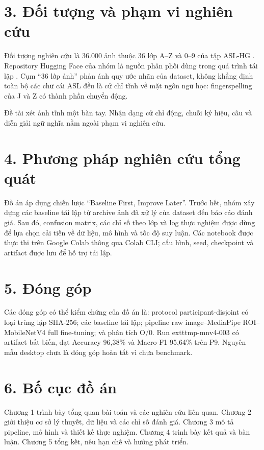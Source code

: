 \section*{3. Đối tượng và phạm vi nghiên cứu}
Đối tượng nghiên cứu là 36.000 ảnh thuộc 36 lớp A--Z và 0--9 của tập ASL-HG \cite{asl-hg-original}. Repository Hugging Face của nhóm là nguồn phân phối dùng trong quá trình tái lập \cite{asl-hg-repo}. Cụm ``36 lớp ảnh'' phản ánh quy ước nhãn của dataset, không khẳng định toàn bộ các chữ cái ASL đều là cử chỉ tĩnh về mặt ngôn ngữ học: fingerspelling của J và Z có thành phần chuyển động.

Đề tài xét ảnh tĩnh một bàn tay. Nhận dạng cử chỉ động, chuỗi ký hiệu, câu và diễn giải ngữ nghĩa nằm ngoài phạm vi nghiên cứu.

\section*{4. Phương pháp nghiên cứu tổng quát}
Đồ án áp dụng chiến lược ``Baseline First, Improve Later''. Trước hết, nhóm xây dựng các baseline tái lập từ archive ảnh đã xử lý của dataset đến báo cáo đánh giá. Sau đó, confusion matrix, các chỉ số theo lớp và log thực nghiệm được dùng để lựa chọn cải tiến về dữ liệu, mô hình và tốc độ suy luận. Các notebook được thực thi trên Google Colab thông qua Colab CLI; cấu hình, seed, checkpoint và artifact được lưu để hỗ trợ tái lập.

\section*{5. Đóng góp}
Các đóng góp có thể kiểm chứng của đồ án là: protocol participant-disjoint có loại trùng lặp SHA-256; các baseline tái lập; pipeline raw image--MediaPipe ROI--MobileNetV4 full fine-tuning; và phân tích O/0. Run 	exttt{mp-mnv4-003} có artifact bất biến, đạt Accuracy 96,38\% và Macro-F1 95,64\% trên P9. Nguyên mẫu desktop chưa là đóng góp hoàn tất vì chưa benchmark.

\section*{6. Bố cục đồ án}
Chương 1 trình bày tổng quan bài toán và các nghiên cứu liên quan. Chương 2 giới thiệu cơ sở lý thuyết, dữ liệu và các chỉ số đánh giá. Chương 3 mô tả pipeline, mô hình và thiết kế thực nghiệm. Chương 4 trình bày kết quả và bàn luận. Chương 5 tổng kết, nêu hạn chế và hướng phát triển.
